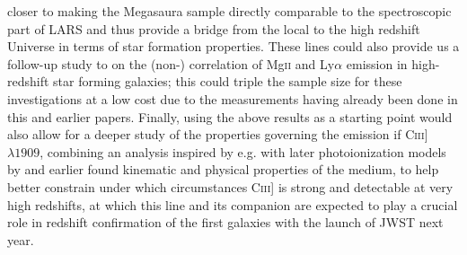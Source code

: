 \documentclass[12pt]{amsart}
\begin{document}
\begin{description}
		closer to making the Megasaura sample directly comparable to the
		spectroscopic part of LARS and thus provide a bridge from
		the local to the high redshift Universe in terms of star
		formation properties. These lines could also provide us a
		follow-up study to \cite{Rigby2014} on the (non-) correlation of
		Mg\textsc{ii} and Ly$\alpha$ emission in high-redshift
		star forming galaxies; this could triple the sample size for
		these investigations at a low cost due to the measurements
		having already been done in this and earlier papers. 
		Finally, using the above results as a
		starting point would also allow for a deeper study of the
	        properties governing the emission if C\textsc{iii}] 
		$\lambda 1909$, combining an analysis inspired by e.g.
		\cite{Rigby2015} with later photoionization models by
		\cite{Jaskot2016} and earlier found kinematic and physical
		properties of the medium, to help better constrain under which
	        circumstances C\textsc{iii}] is strong and detectable at very
		high redshifts, at which this line and its companion are
		expected to play a crucial role in redshift confirmation of the
		first galaxies with the launch of JWST next year.
		

\end{description}
\end{document}
